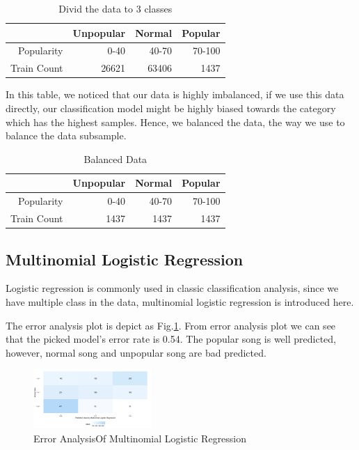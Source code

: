 \documentclass[conference]{IEEEtran}
\begin{document}
\begin{table}[ht]
\centering
\caption{Divid the data to 3 classes}
\begin{tabular}{rrrr}
  \hline
&Unpopular & Normal & Popular \\ 
  \hline
Popularity& 0-40& 40-70&70-100 \\ 
Train Count&26621 & 63406 &1437 \\                                           
   \hline
\end{tabular}
\label{Divid the data to 3 classes}		
\end{table}
In this table, we noticed that our data is highly imbalanced, if we use this data directly, our classification model might be highly biased towards the category which has the highest samples. Hence, we balanced the data, the way we use to balance the data subsample. 
\begin{table}[ht]
  \centering
  \caption{Balanced Data}
  \begin{tabular}{rrrr}
    \hline
  &Unpopular & Normal & Popular \\ 
    \hline
  Popularity& 0-40& 40-70&70-100 \\ 
  Train Count&1437 & 1437 &1437 \\                                           
     \hline
  \end{tabular}
  \label{Balanced Data}		
  \end{table}

\subsection{Multinomial Logistic Regression}
Logistic regression is commonly used in classic classification analysis, since we have multiple class in the data, multinomial logistic regression is introduced here.

The error analysis plot is depict as Fig.\ref{errorMultinomialLogisticRegression}. From error analysis plot we can see that the picked model's error rate is 0.54. The popular song is well predicted, however, normal song and unpopular song are bad predicted.


\begin{figure}[htbp]
\centerline{\includegraphics[width=0.4\textwidth]{figure/errorMultinomialLogisticRegression.png}}
\caption{Error Analysis\protect\footnotemark Of Multinomial Logistic Regression}
\label{errorMultinomialLogisticRegression}
\end{figure}
\end{document}
